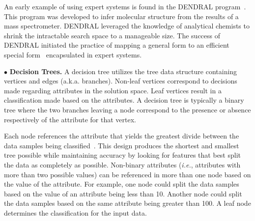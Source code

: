 \documentclass[conference]{IEEEtran}
\begin{document}
An early example of using expert systems is found in the DENDRAL program~\cite{Buchanan:69}. This program was developed to infer molecular structure from the results of a mass spectrometer. DENDRAL leveraged the knowledge of analytical chemists to shrink the intractable search space to a manageable size. The success of DENDRAL initiated the practice of mapping a general form to an efficient special form~\cite{Feigenbaum:71} encapsulated in expert systems.

$\bullet$ {\bf Decision Trees.} A decision tree utilizes the tree data structure containing vertices and edges (a.k.a. branches). Non-leaf vertices correspond to decisions made regarding attributes in the solution space. Leaf vertices result in a classification made based on the attributes. A decision tree is typically a binary tree where the two branches leaving a node correspond to the presence or absence respectively of the attribute for that vertex.

Each node references the attribute that yields the greatest divide between the data samples being classified~\cite{Russell:10}. This design produces the shortest and smallest tree
possible while maintaining accuracy by looking for features that
best split the data as completely as possible.
Non-binary attributes (\emph{i.e.}, attributes with more than two possible values) can be referenced in more than one node based on the value of the attribute. For example, one node could split the data samples based on the value of an attribute being less than 10. Another node could split the data samples based on the same attribute being greater than 100. A leaf node determines the classification for the input data.


\end{document}
